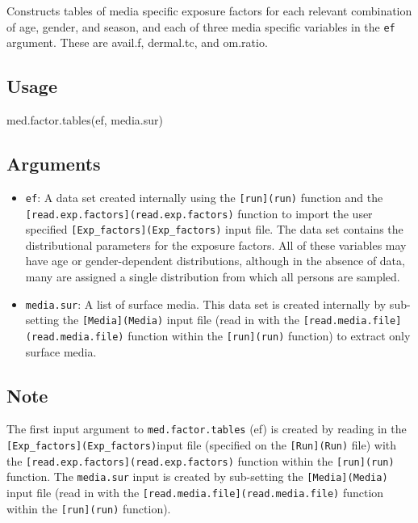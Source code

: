 \documentclass[
]{article}
\newenvironment{Shaded}{\begin{snugshade}}{\end{snugshade}}
\newcommand{\FunctionTok}[1]{\textcolor[rgb]{0.00,0.00,0.00}{#1}}
\newcommand{\NormalTok}[1]{#1}
\providecommand{\tightlist}{%
  \setlength{\itemsep}{0pt}\setlength{\parskip}{0pt}}
\begin{document}
Constructs tables of media specific exposure factors for each relevant
combination of age, gender, and season, and each of three media specific
variables in the \texttt{ef} argument. These are avail.f, dermal.tc, and
om.ratio.

\hypertarget{usage-29}{%
\subsection{Usage}\label{usage-29}}

\begin{Shaded}
\begin{Highlighting}[]
\FunctionTok{med.factor.tables}\NormalTok{(ef, media.sur)}
\end{Highlighting}
\end{Shaded}

\hypertarget{arguments-26}{%
\subsection{Arguments}\label{arguments-26}}

\begin{itemize}
\tightlist
\item
  \texttt{ef}: A data set created internally using the
  \texttt{{[}run{]}(run)} function and the
  \texttt{{[}read.exp.factors{]}(read.exp.factors)} function to import
  the user specified \texttt{{[}Exp\_factors{]}(Exp\_factors)} input
  file. The data set contains the distributional parameters for the
  exposure factors. All of these variables may have age or
  gender-dependent distributions, although in the absence of data, many
  are assigned a single distribution from which all persons are sampled.
\item
  \texttt{media.sur}: A list of surface media. This data set is created
  internally by sub-setting the \texttt{{[}Media{]}(Media)} input file
  (read in with the \texttt{{[}read.media.file{]}(read.media.file)}
  function within the \texttt{{[}run{]}(run)} function) to extract only
  surface media.
\end{itemize}

\hypertarget{note-2}{%
\subsection{Note}\label{note-2}}

The first input argument to \texttt{med.factor.tables} (ef) is created
by reading in the \texttt{{[}Exp\_factors{]}(Exp\_factors)}input file
(specified on the \texttt{{[}Run{]}(Run)} file) with the
\texttt{{[}read.exp.factors{]}(read.exp.factors)} function within the
\texttt{{[}run{]}(run)} function. The \texttt{media.sur} input is
created by sub-setting the \texttt{{[}Media{]}(Media)} input file (read
in with the \texttt{{[}read.media.file{]}(read.media.file)} function
within the \texttt{{[}run{]}(run)} function).
\end{document}
